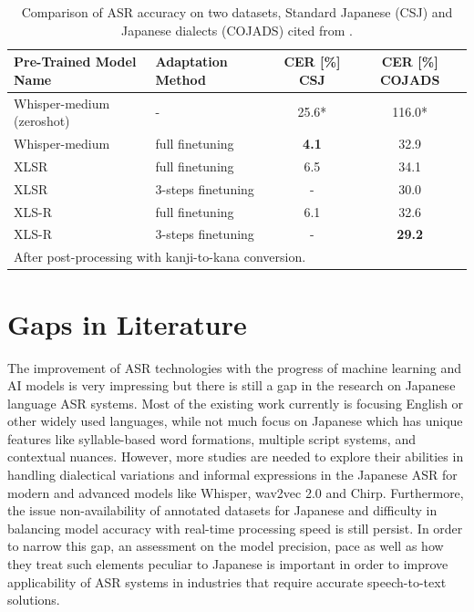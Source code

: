 \begin{table}[h!]
    \centering
    \caption{Comparison of ASR accuracy on two datasets, Standard Japanese (CSJ) and Japanese dialects (COJADS) cited from \cite{takahashi2024comparison}.}
    \begin{tabular}{|l|l|c|c|}
    \hline
    \textbf{Pre-Trained Model Name} & \textbf{Adaptation Method} & \textbf{CER [\%] CSJ} & \textbf{CER [\%] COJADS} \\ \hline
    Whisper-medium (zeroshot)       & -                              & 25.6*                 & 116.0*                   \\ \hline
    Whisper-medium                  & full finetuning                & \textbf{4.1}          & 32.9                     \\ \hline
    XLSR                            & full finetuning                & 6.5                   & 34.1                     \\ \hline
    XLSR                            & 3-steps finetuning             & -                     & 30.0                     \\ \hline
    XLS-R                           & full finetuning                & 6.1                   & 32.6                     \\ \hline
    XLS-R                           & 3-steps finetuning             & -                     & \textbf{29.2}            \\ \hline
    \multicolumn{4}{l}{\footnotesize *After post-processing with kanji-to-kana conversion.} \\
    \end{tabular}
    \label{tab:asr_comparison}
\end{table}

\section{Gaps in Literature}
The improvement of ASR technologies with the progress of machine learning and AI models is very impressing but there is still a gap in the research on Japanese language ASR systems. Most of the existing work currently is focusing English or other widely used languages, while not much focus on Japanese which has unique features like syllable-based word formations, multiple script systems, and contextual nuances. However, more studies are needed to explore their abilities in handling dialectical variations and informal expressions in the Japanese ASR for modern and advanced models like Whisper, wav2vec 2.0 and Chirp. Furthermore, the issue non-availability of annotated datasets for Japanese and difficulty in balancing model accuracy with real-time processing speed is still persist. In order to narrow this gap, an assessment on the  model precision, pace as well as how they treat such elements peculiar to Japanese is important in order to improve applicability of ASR systems in industries that require accurate speech-to-text solutions.

